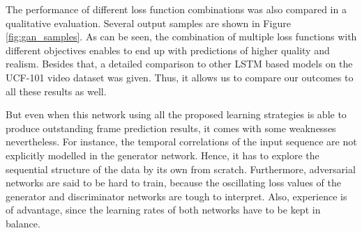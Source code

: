 The performance of different loss function combinations was also compared in a qualitative evaluation. Several output samples are shown in Figure \ref{fig:gan_samples}. As can be seen, the combination of multiple loss functions with different objectives enables to end up with predictions of higher quality and realism. Besides that, a detailed comparison to other LSTM based models on the UCF-101 video dataset was given. Thus, it allows us to compare our outcomes to all these results as well.

But even when this network using all the proposed learning strategies is able to produce outstanding frame prediction results, it comes with some weaknesses nevertheless. For instance, the temporal correlations of the input sequence are not explicitly modelled in the generator network. Hence, it has to explore the sequential structure of the data by its own from scratch. Furthermore, adversarial networks are said to be hard to train, because the oscillating loss values of the generator and discriminator networks are tough to interpret. Also, experience is of advantage, since the learning rates of both networks have to be kept in balance.
